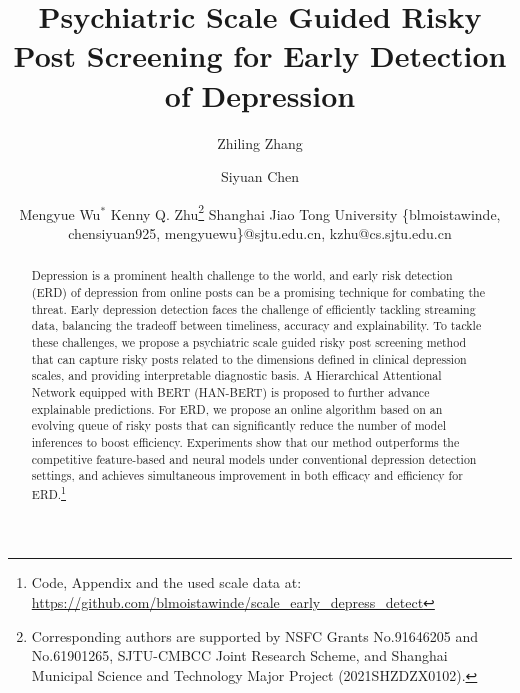 \documentclass{article}
\title{Psychiatric Scale Guided Risky Post Screening for Early 
Detection of Depression}
\author{
Zhiling Zhang \and
Siyuan Chen \and
Mengyue Wu$^*$ \And
Kenny Q. Zhu\thanks{Corresponding authors are supported by NSFC Grants No.91646205 and No.61901265, SJTU-CMBCC Joint Research Scheme, and Shanghai Municipal Science and Technology Major Project (2021SHZDZX0102).}
\affiliations
Shanghai Jiao Tong University
\emails
\{blmoistawinde, chensiyuan925, mengyuewu\}@sjtu.edu.cn,
kzhu@cs.sjtu.edu.cn
}
\begin{document}
\maketitle

\begin{abstract}
    Depression is a prominent health challenge to the world, and early risk detection (ERD) of depression from online posts can be a promising technique for combating the threat. Early depression detection faces the challenge of efficiently tackling streaming data, balancing the tradeoff between timeliness, accuracy and explainability. To tackle these challenges, we propose a psychiatric scale guided risky post screening method that can capture risky posts related to the dimensions defined in clinical depression scales, and providing interpretable diagnostic basis. A Hierarchical Attentional Network equipped with BERT (HAN-BERT) is proposed to further advance explainable predictions. For ERD, we propose an online algorithm based on an evolving queue of risky posts that can significantly reduce the number of model inferences to boost efficiency. Experiments show that our method outperforms the competitive feature-based and neural models under conventional depression detection settings, and achieves simultaneous improvement in both efficacy and efficiency for ERD.\footnote{Code, Appendix and the used scale data at: \url{https://github.com/blmoistawinde/scale_early_depress_detect}} 
\end{abstract}









\end{document}
